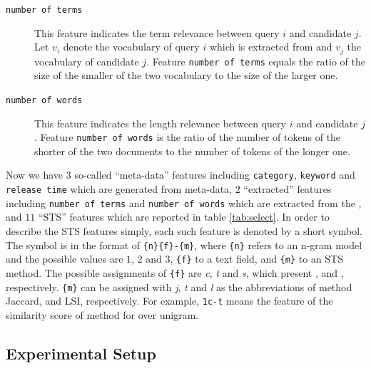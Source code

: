 \begin{description}
    \item[\texttt{number of terms}] This feature indicates the term relevance between query $i$ and candidate $j$. Let $v_i$ denote the vocabulary of query $i$ which is extracted from \icontent{} and $v_j$ the vocabulary of candidate $j$. Feature \texttt{number of terms} equals the ratio of the size of the smaller of the two vocabulary to the size of the larger one. 
    
    \item[\texttt{number of words}] This feature indicates the length relevance between query $i$ and candidate $j$. Feature \texttt{number of words} is the ratio of the number of tokens of the shorter of the two \icontent{} documents to the number of tokens of the longer one. 
\end{description}

Now we have $3$ so-called ``meta-data'' features including \texttt{category}, \texttt{keyword} and \texttt{release time} which are generated from meta-data, $2$ ``extracted'' features including \texttt{number of terms} and \texttt{number of words} which are extracted from the \icontent{}, and $11$ ``STS'' features which are reported in table \ref{tab:select}. In order to describe the STS features simply, each such feature is denoted by a short symbol. The symbol is in the format of \texttt{\{n\}\{f\}-\{m\}}, where \texttt{\{n\}} refers to an n-gram model and the possible values are $1$, $2$ and $3$, \texttt{\{f\}} to a text field, and \texttt{\{m\}} to an STS method. The possible assignments of \texttt{\{f\}} are \textit{c}, \textit{t} and \textit{s}, which present \icontent{}, \ititle{} and \isummary{}, respectively. \texttt{\{m\}} can be assigned with \textit{j}, \textit{t} and \textit{l} as the abbreviations of method Jaccard, \tfidf{} and LSI, respectively. For example, \texttt{1c-t} means the feature of the similarity score of method \tfidf{} for \icontent{} over unigram.


\subsection{Experimental Setup}
\label{sec:6.3}


